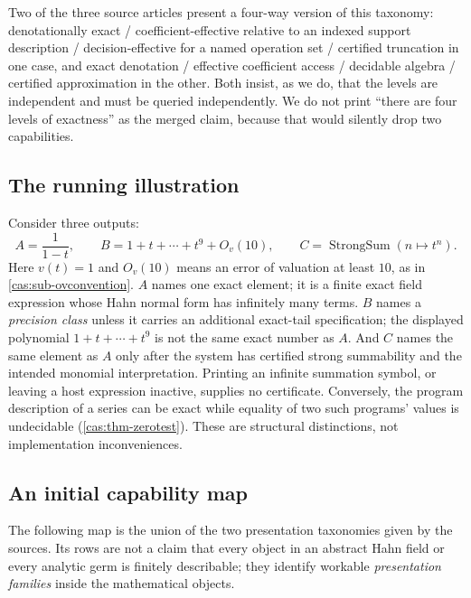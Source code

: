 \documentclass[11pt,letterpaper]{article}
\numberwithin{equation}{section}
\theoremstyle{definition}
\theoremstyle{remark}
\newcommand{\Ov}[1]{O_v(#1)}
\begin{document}
Two of the three source articles present a four-way version of this taxonomy:
denotationally exact / coefficient-effective relative to an indexed support
description / decision-effective for a named operation set / certified
truncation in one case, and exact denotation / effective coefficient access /
decidable algebra / certified approximation in the other. Both insist, as we do,
that the levels are independent and must be queried independently. We do not
print ``there are four levels of exactness'' as the merged claim, because that
would silently drop two capabilities.

\subsection{The running illustration}
\label{cas:sub-abc}
Consider three outputs:
\[
 A=\frac1{1-t},\qquad
 B=1+t+\cdots+t^9+\Ov{10},\qquad
 C=\operatorname{StrongSum}(n\mapsto t^n).
\]
Here $v(t)=1$ and $\Ov{10}$ means an error of valuation at least $10$, as in
\cref{cas:sub-ovconvention}. $A$ names one exact element; it is a finite exact field expression whose
Hahn normal form has infinitely many terms. $B$ names a \emph{precision class}
unless it carries an additional exact-tail specification; the displayed
polynomial $1+t+\cdots+t^9$ is not the same exact number as $A$. And $C$ names
the same element as $A$ only after the system has certified strong summability
and the intended monomial interpretation. Printing an infinite summation symbol,
or leaving a host expression inactive, supplies no certificate. Conversely, the
program description of a series can be exact while equality of two such
programs' values is undecidable (\cref{cas:thm-zerotest}). These are structural
distinctions, not implementation inconveniences.

\subsection{An initial capability map}
\label{cas:sub-capmap}
The following map is the union of the two presentation taxonomies given by the
sources. Its rows are not a claim that every object in an abstract Hahn field or
every analytic germ is finitely describable; they identify workable
\emph{presentation families} inside the mathematical objects.
\end{document}
